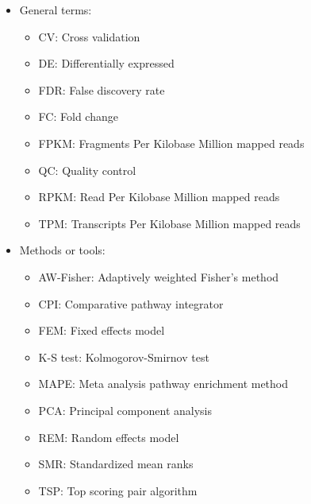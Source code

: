 \begin{itemize}
\item General terms:
\begin{itemize}
\item CV: Cross validation
\item DE:  Differentially expressed
\item FDR: False discovery rate
\item FC: Fold change
\item FPKM: Fragments Per Kilobase Million mapped reads
\item QC: Quality control
\item RPKM: Read Per Kilobase Million mapped reads
\item TPM: Transcripts Per Kilobase Million mapped reads
\end{itemize}

\item Methods or tools:
\begin{itemize}
\item AW-Fisher: Adaptively weighted Fisher's method
\item CPI: Comparative pathway integrator 
\item FEM: Fixed effects model
\item K-S test: Kolmogorov-Smirnov test
\item MAPE: Meta analysis pathway enrichment method
\item PCA: Principal component analysis
\item REM: Random effects model
\item SMR: Standardized mean ranks
\item TSP: Top scoring pair algorithm

\end{itemize}

\end{itemize}




